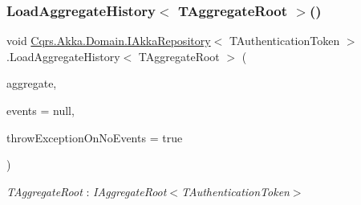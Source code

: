 \subsubsection{\texorpdfstring{Load\+Aggregate\+History$<$ T\+Aggregate\+Root $>$()}{LoadAggregateHistory< TAggregateRoot >()}}
{\footnotesize\ttfamily void \hyperlink{interfaceCqrs_1_1Akka_1_1Domain_1_1IAkkaRepository}{Cqrs.\+Akka.\+Domain.\+I\+Akka\+Repository}$<$ T\+Authentication\+Token $>$.Load\+Aggregate\+History$<$ T\+Aggregate\+Root $>$ (\begin{DoxyParamCaption}\item[{T\+Aggregate\+Root}]{aggregate,  }\item[{I\+List$<$ \hyperlink{interfaceCqrs_1_1Events_1_1IEvent}{I\+Event}$<$ T\+Authentication\+Token $>$$>$}]{events = {\ttfamily null},  }\item[{bool}]{throw\+Exception\+On\+No\+Events = {\ttfamily true} }\end{DoxyParamCaption})}

\begin{Desc}
\item[Type Constraints]\begin{description}
\item[{\em T\+Aggregate\+Root} : {\em I\+Aggregate\+Root$<$T\+Authentication\+Token$>$}]\end{description}
\end{Desc}
